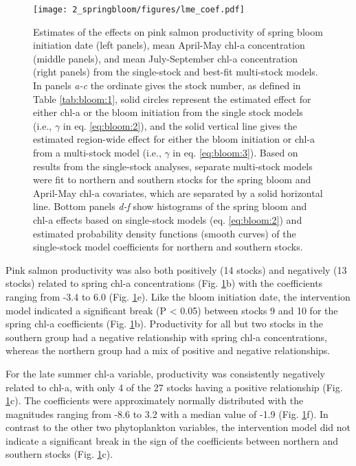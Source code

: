 \begin{figure}[htbp]
  \centering \texttt{[image: 2\_springbloom/figures/lme\_coef.pdf]}
  \caption[Estimates of the effects on salmon productivity of spring
           bloom initiation date and chl-a concentrations.]{Estimates of the
           effects on pink salmon productivity of spring bloom initiation date
           (left panels), mean April-May chl-a concentration (middle panels),
           and mean July-September chl-a concentration (right panels) from the
           single-stock and best-fit multi-stock models. In panels \emph{a-c}
           the ordinate gives the stock number, as defined in Table
           \ref{tab:bloom:1}, solid circles represent the estimated effect for
           either chl-a or the bloom initiation from the single stock models
           (i.e., \(\gamma\) in eq.  \ref{eq:bloom:2}), and the solid vertical
           line gives the estimated region-wide effect for either the bloom
           initiation or chl-a from a multi-stock model (i.e., \(\gamma\) in eq.
           \ref{eq:bloom:3}). Based on results from the single-stock analyses,
           separate multi-stock models were fit to northern and southern stocks
           for the spring bloom and April-May chl-a covariates, which are
           separated by a solid horizontal line. Bottom panels \emph{d-f} show
           histograms of the spring bloom and chl-a effects based on
           single-stock models (eq. \ref{eq:bloom:2}) and estimated probability
           density functions (smooth curves) of the single-stock model
           coefficients for northern and southern stocks.}
  \label{fig:bloom:6}
\end{figure}

Pink salmon productivity was also both positively (14 stocks) and negatively (13
stocks) related to spring chl-a concentrations (Fig. \ref{fig:bloom:6}b) with
the coefficients ranging from -3.4 to 6.0 (Fig. \ref{fig:bloom:6}e). Like the
bloom initiation date, the intervention model indicated a significant break (P
\textless{} 0.05) between stocks 9 and 10 for the spring chl-a coefficients
(Fig. \ref{fig:bloom:6}b). Productivity for all but two stocks in the southern
group had a negative relationship with spring chl-a concentrations, whereas the
northern group had a mix of positive and negative relationships.

For the late summer chl-a variable, productivity was consistently negatively
related to chl-a, with only 4 of the 27 stocks having a positive relationship
(Fig. \ref{fig:bloom:6}c). The coefficients were approximately normally
distributed with the magnitudes ranging from -8.6 to 3.2 with a median value of
-1.9 (Fig.  \ref{fig:bloom:6}f). In contrast to the other two phytoplankton
variables, the intervention model did not indicate a significant break in the
sign of the coefficients between northern and southern stocks (Fig.
\ref{fig:bloom:6}c).

